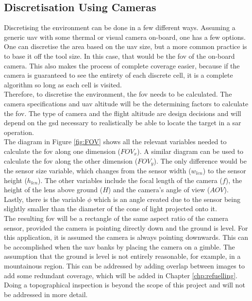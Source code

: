 \subsection{Discretisation Using Cameras}
Discretising the environment can be done in a few different ways. Assuming a generic \acs{uav} with some thermal or visual camera on-board, one has a few options. One can discretise the area based on the \acs{uav} size, but a more common practice is to base it off the tool size. In this case, that would be the \acf{fov} of the on-board camera. This also makes the process of complete coverage easier, because if the camera is guaranteed to see the entirety of each discrete cell, it is a complete algorithm so long as each cell is visited.\\
Therefore, to discretise the environment, the \acl{fov} needs to be calculated. The camera specifications and \acs{uav} altitude will be the determining factors to calculate the \acs{fov}. The type of camera and the flight altitude are design decisions and will depend on the \acs{gsd} necessary to realistically be able to locate the target in a \acl{sar} operation.\\
The diagram in Figure \ref{fig:FOV} shows all the relevant variables needed to calculate the \acl{fov} along one dimension ($FOV_x$). A similar diagram can be used to calculate the \acl{fov} along the other dimension ($FOV_y$). The only difference would be the sensor size variable, which changes from the sensor width ($w_{len}$) to the sensor height ($h_{len}$). The other variables include the focal length of the camera ($f$), the height of the lens above ground ($H$) and the camera's angle of view ($AOV$). Lastly, there is the variable $\phi$ which is an angle created due to the sensor being slightly smaller than the diameter of the cone of light projected onto it.\\
The resulting \acl{fov} will be a rectangle of the same aspect ratio of the camera sensor, provided the camera is pointing directly down and the ground is level. For this application, it is assumed the camera is always pointing downwards. This can be accomplished when the \acs{uav} banks by placing the camera on a gimble. The assumption that the ground is level is not entirely reasonable, for example, in a mountainous region. This can be addressed by adding overlap between images to add some redundant coverage, which will be added in Chapter \ref{chp:refuelling}. Doing a topographical inspection is beyond the scope of this project and will not be addressed in more detail.\\
